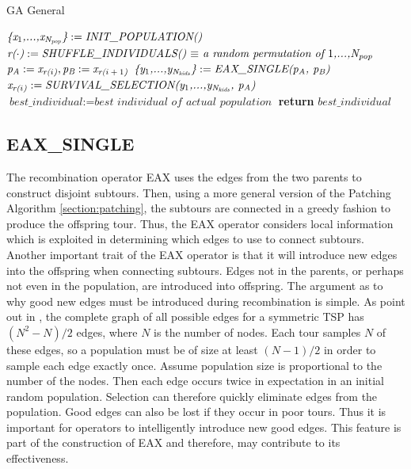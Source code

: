\begin{algorithm}
\caption{GA General}\label{alg:gagen}
\begin{algorithmic}[1]
\State $\textit{\{x\textsubscript{$1$},...,x\textsubscript{N\textsubscript{pop}}\}} := \textit{INIT\_POPULATION()}$
	\State $\textit{r($\cdot$)} := \textit{SHUFFLE\_INDIVIDUALS() $\equiv$ a random permutation of $1$,...,N\textsubscript{pop} } $
		\State $\textit{p\textsubscript{A}} := \textit{x\textsubscript{r($i$)}} , \textit{p\textsubscript{B}} := \textit{x\textsubscript{r($i+1$)}} $
		\State $\textit{\{y\textsubscript{$1$},...,y\textsubscript{N\textsubscript{kids}}\}} := \textit{EAX\_SINGLE(p\textsubscript{A}, p\textsubscript{B})}$
		\State $\textit{x\textsubscript{r($i$)}} := \textit{SURVIVAL\_SELECTION(y\textsubscript{$1$},...,y\textsubscript{N\textsubscript{kids}}, p\textsubscript{A})} $
	\EndFor
	\State $\textit{best\_individual} := \textit{best individual of actual population}$
\EndWhile
\State \textbf{return} $best\_individual$
\EndProcedure
\end{algorithmic}
\end{algorithm}

\subsection{EAX\_SINGLE}
The recombination operator EAX uses the edges from the two parents to construct disjoint subtours.
Then, using a more general version of the Patching Algorithm \ref{section:patching}, the subtours are connected in a greedy fashion to produce the offspring tour. Thus, the EAX operator considers local information which is exploited in determining which edges to use to connect subtours.\\
Another important trait of the EAX operator is that it will introduce new edges into the offspring when connecting subtours. Edges not in the parents, or perhaps not even in the population, are introduced into offspring. 
The argument as to why good new edges must be introduced during recombination is simple. As point out in \cite{Mathias92geneticoperators}, the complete graph of all possible edges for a symmetric TSP has $(N^2-N)/2$ edges, where $N$ is the number of nodes. Each tour samples $N$ of these edges, so a population must be of size at least $(N-1)/2$ in order to sample each edge exactly once. Assume population size is proportional to the number of the nodes. Then each edge occurs twice in expectation in an initial random population. Selection can therefore quickly eliminate edges from the population. Good edges can also be lost if they occur in poor tours. Thus it is important for operators to intelligently introduce new good edges. This feature is part of the construction of EAX and therefore, may contribute to its effectiveness.\\

